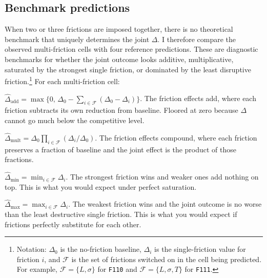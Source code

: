 \subsection{Benchmark predictions}
\label{sec:factorial-benchmarks}

When two or three frictions are imposed together, there is no theoretical benchmark that uniquely determines the joint $\Delta$. I therefore compare the observed multi-friction cells with four reference predictions. These are diagnostic benchmarks for whether the joint outcome looks additive, multiplicative, saturated by the strongest single friction, or dominated by the least disruptive friction.\footnote{Notation: $\Delta_0$ is the no-friction baseline, $\Delta_i$ is the single-friction value for friction $i$, and $\mathcal{F}$ is the set of frictions switched on in the cell being predicted. For example, $\mathcal{F}=\{L,\sigma\}$ for \texttt{F110} and $\mathcal{F}=\{L,\sigma,T\}$ for \texttt{F111}.} For each multi-friction cell:
\begin{description}[leftmargin=2.4em, style=nextline]
    \item[Additive] $\widehat\Delta_{\mathrm{add}} = \max\{0,\, \Delta_0 - \sum_{i\in\mathcal{F}}(\Delta_0 - \Delta_i)\}$. The friction effects add, where each friction subtracts its own reduction from baseline. Floored at zero because $\Delta$ cannot go much below the competitive level.
    \item[Multiplicative] $\widehat\Delta_{\mathrm{mult}} = \Delta_0 \prod_{i\in\mathcal{F}}(\Delta_i/\Delta_0)$. The friction effects compound, where each friction preserves a fraction of baseline and the joint effect is the product of those fractions.
    \item[Minimum] $\widehat\Delta_{\mathrm{min}} = \min_{i\in\mathcal{F}}\Delta_i$. The strongest friction wins and weaker ones add nothing on top. This is what you would expect under perfect saturation.
    \item[Maximum] $\widehat\Delta_{\mathrm{max}} = \max_{i\in\mathcal{F}}\Delta_i$. The weakest friction wins and the joint outcome is no worse than the least destructive single friction. This is what you would expect if frictions perfectly substitute for each other.
\end{description}

\newpage
